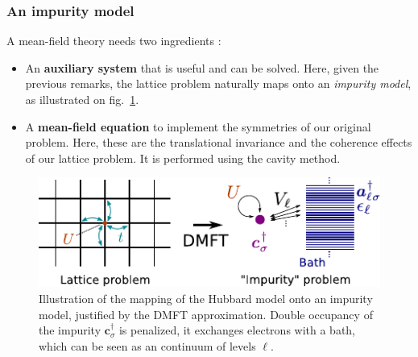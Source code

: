 \documentclass[reprint,amsmath,amssymb,aps,pra]{revtex4-2}
\newcommand{\tmbf}[1]{\ensuremath{\boldsymbol{#1}}}
\begin{document}
\subsubsection{An impurity model}

A mean-field theory needs two ingredients :
\begin{itemize}
    \item An \textbf{auxiliary system} that is useful and can be solved. Here, given the previous remarks, the lattice problem naturally maps onto an \textit{impurity model}, as illustrated on fig.\ \ref{fig:sch-impurity-mapping}.
    \item A \textbf{mean-field equation} to implement the symmetries of our original problem. Here, these are the translational invariance and the coherence effects of our lattice problem. It is performed using the cavity method\cite{Georges1996}.
\end{itemize}

\begin{figure}[H]
\centering\includegraphics[width=\columnwidth]{mapping-impurity-compressed.pdf}
\caption{\label{fig:sch-impurity-mapping}Illustration of the mapping of the Hubbard model onto an impurity model, justified by the DMFT approximation. Double occupancy of the impurity $\tmbf{c}_{\sigma}^{\dag}$ is penalized, it exchanges electrons with a bath, which can be seen as an continuum of levels $\ell$.}
\end{figure}
\end{document}
